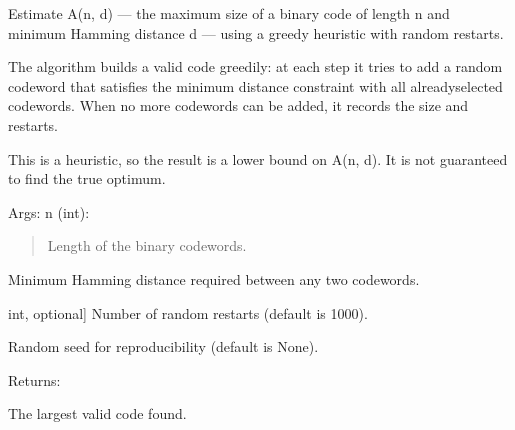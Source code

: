 \documentclass[letterpaper,10pt,english]{sphinxmanual}
\begin{document}
\begin{fulllineitems}
\label{\detokenize{index:hammindist.functions.heuristic}}
\pysigstartsignatures
\pysiglinewithargsret
{}
{\sphinxparamcomma {}\sphinxparamcomma {}\sphinxparamcomma {}}
{}
\pysigstopsignatures
\sphinxAtStartPar
Estimate A(n, d) — the maximum size of a binary code of length n
and minimum Hamming distance d — using a greedy heuristic with
random restarts.

\sphinxAtStartPar
The algorithm builds a valid code greedily: at each step it tries
to add a random codeword that satisfies the minimum distance
constraint with all already\sphinxhyphen{}selected codewords. When no more
codewords can be added, it records the size and restarts.

\sphinxAtStartPar
This is a heuristic, so the result is a lower bound on A(n, d).
It is not guaranteed to find the true optimum.

\sphinxAtStartPar
Args:
n (int):
\begin{quote}

\sphinxAtStartPar
Length of the binary codewords.
\end{quote}
\begin{description}
\sphinxAtStartPar
Minimum Hamming distance required between any two codewords.

\sphinxlineitem{iterations}{[}int, optional{]}
\sphinxAtStartPar
Number of random restarts (default is 1000).

\sphinxAtStartPar
Random seed for reproducibility (default is None).

\end{description}

\sphinxAtStartPar
Returns:
\begin{description}
\sphinxAtStartPar
The largest valid code found.

\end{description}

\end{fulllineitems}

\end{document}
